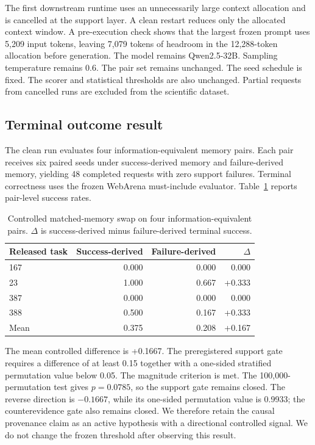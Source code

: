 The first downstream runtime uses an unnecessarily large context allocation and is cancelled at the support layer. A clean restart reduces only the allocated context window. A pre-execution check shows that the largest frozen prompt uses 5,209 input tokens, leaving 7,079 tokens of headroom in the 12,288-token allocation before generation. The model remains Qwen2.5-32B. Sampling temperature remains 0.6. The pair set remains unchanged. The seed schedule is fixed. The scorer and statistical thresholds are also unchanged. Partial requests from cancelled runs are excluded from the scientific dataset.

\subsection{Terminal outcome result}
The clean run evaluates four information-equivalent memory pairs. Each pair receives six paired seeds under success-derived memory and failure-derived memory, yielding 48 completed requests with zero support failures. Terminal correctness uses the frozen WebArena must-include evaluator. Table~\ref{tab:swap} reports pair-level success rates.

\begin{table}[t]
\centering
\caption{Controlled matched-memory swap on four information-equivalent pairs. $\Delta$ is success-derived minus failure-derived terminal success.}
\label{tab:swap}
\begin{tabular}{lrrr}
\toprule
Released task & Success-derived & Failure-derived & $\Delta$ \\
\midrule
167 & 0.000 & 0.000 & 0.000 \\
23  & 1.000 & 0.667 & +0.333 \\
387 & 0.000 & 0.000 & 0.000 \\
388 & 0.500 & 0.167 & +0.333 \\
\midrule
Mean & 0.375 & 0.208 & +0.167 \\
\bottomrule
\end{tabular}
\end{table}

The mean controlled difference is +0.1667. The preregistered support gate requires a difference of at least 0.15 together with a one-sided stratified permutation value below 0.05. The magnitude criterion is met. The 100,000-permutation test gives $p=0.0785$, so the support gate remains closed. The reverse direction is $-0.1667$, while its one-sided permutation value is 0.9933; the counterevidence gate also remains closed. We therefore retain the causal provenance claim as an active hypothesis with a directional controlled signal. We do not change the frozen threshold after observing this result.

